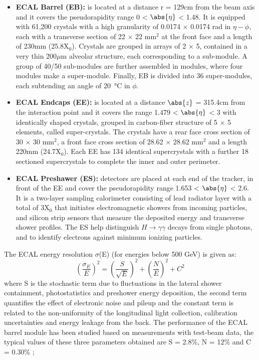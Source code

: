 \begin{itemize}
\item{\textbf{ECAL Barrel (EB):}} is located at a distance r = 129cm from the beam axis and it covers the pseudorapidity range 0 < $\abs{\eta}$ < 1.48. It is equipped with 61,200 crystals with a high granularity of 0.0174 $\times$ 0.0174 rad in $\eta-\phi$, each with a transverse section of 22 $\times$ 22 mm$^{2}$ at the front face and a length of 230mm (25.8X$_{0}$). Crystals are grouped in arrays of 2 $\times$ 5, contained in a very thin 200$\mu$m alveolar structure, each corresponding to a sub-module. A group of 40/50 sub-modules are further assembled in modules, where four modules make a super-module.  Finally, EB is divided into 36 super-modules, each subtending an angle of \SI{20}{\celsius} in $\phi$. 
\item{\textbf{ECAL Endcaps (EE):}} is located at a distance $\abs{z}$ = 315.4cm from the interaction point and it covers the range 1.479 < $\abs{\eta}$ < 3 with identically shaped crystals, grouped in carbon-fiber structure of 5 $\times$ 5 elements, called super-crystals. The crystals have a rear face cross section of 30 $\times$ 30 mm$^{2}$, a front face cross section of 28.62 $\times$ 28.62 mm$^{2}$ and a length 220mm (24.7X$_{0}$). Each EE has 134 identical supercrystals with a further 18 sectioned supercrystals to complete the inner and outer perimeter.
\item{\textbf{ECAL Preshawer (ES):}} detectors are placed at each end of the tracker, in front of the EE and cover the pseudorapidity range 1.653 < $\abs{\eta}$ < 2.6. It is a two-layer sampling calorimeter consisting of lead radiator layer with a total of 3X$_{0}$ that initiates electromagnetic showers from incoming particles, and silicon strip sensors that measure the deposited energy and transverse shower profiles. The ES help distinguish $H \rightarrow \gamma\gamma$ decays from single photons, and to identify electrons against minimum ionizing particles.
\end{itemize}
The ECAL energy resolution $\sigma$(E) (for energies below 500 GeV) is given as:
\begin{equation}
(\frac{\sigma_{E}}{E})^{2} = (\frac{S}{\sqrt{E}})^{2} + (\frac{N}{E})^{2} + C^{2}
\end{equation}
where S is the stochastic term due to fluctuations in the lateral shower containment, photostatistics and preshower energy deposition, the second term quantifies the effect of electronic noise and pileup and the constant term is related to the non-uniformity of the longitudinal light collection, calibration uncertainties and energy leakage from the back. The performance of the ECAL barrel module has been studied based on measurements with test-beam data, the typical values of these three parameters obtained are S = 2.8\%, N = 12\% and C = 0.30\% \cite{ecal_resol};

